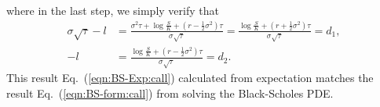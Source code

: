 \documentclass{book}
\begin{document}
where in the last step, we simply verify that
\begin{align*}
    \sigma\sqrt{\tau} - l &= \frac{\sigma^2 \tau + \log \frac{S}{K} + \left(r - \frac{1}{2} \sigma^2\right)\tau} {\sigma \sqrt{\tau}} = \frac{\log \frac{S}{K} + \left(r + \frac{1}{2} \sigma^2\right)\tau} {\sigma \sqrt{\tau}} = d_1, \\
    -l &= \frac{\log \frac{S}{K} + \left(r - \frac{1}{2} \sigma^2\right)\tau} {\sigma \sqrt{\tau}} = d_2.
\end{align*}
This result Eq.~(\ref{eqn:BS-Exp:call}) calculated from expectation matches the result Eq.~(\ref{eqn:BS-form:call}) from solving the Black-Scholes PDE.

\ifdefined\isSubfile
\else
  
\end{document}
